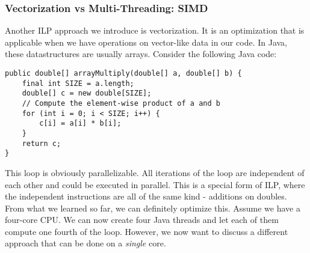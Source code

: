 \documentclass[main.tex]{subfiles}
\begin{document}
\subsubsection{Vectorization vs Multi-Threading: SIMD}
Another ILP approach we introduce is vectorization. It is an optimization that is applicable when we have operations on vector-like data in our code. In Java, these datastructures are usually arrays. Consider the following Java code:
\begin{verbatim}
public double[] arrayMultiply(double[] a, double[] b) {
    final int SIZE = a.length;
    double[] c = new double[SIZE];
    // Compute the element-wise product of a and b
    for (int i = 0; i < SIZE; i++) {
        c[i] = a[i] * b[i];
    }
    return c;
}
\end{verbatim}
This loop is obviously parallelizable. All iterations of the loop are independent of each other and could be executed in parallel. This is a special form of ILP, where the independent instructions are all of the same kind - additions on doubles. From what we learned so far, we can definitely optimize this. Assume we have a four-core CPU. We can now create four Java threads and let each of them compute one fourth of the loop. However, we now want to discuss a different approach that can be done on a \textit{single} core.
\end{document}
